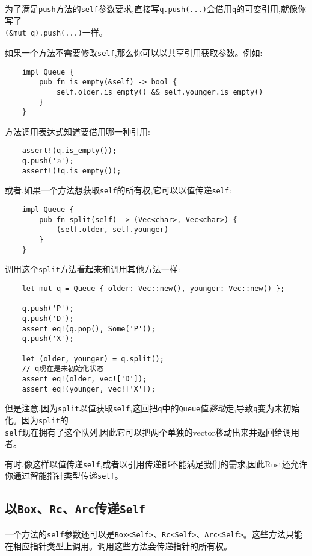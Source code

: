 为了满足\texttt{push}方法的\texttt{self}参数要求,直接写\texttt{q.push(...)}会借用\texttt{q}的可变引用,就像你写了\\
\texttt{(\&mut q).push(...)}一样。

如果一个方法不需要修改\texttt{self},那么你可以以共享引用获取参数。例如:
\begin{verbatim}
    impl Queue {
        pub fn is_empty(&self) -> bool {
            self.older.is_empty() && self.younger.is_empty()
        }
    }
\end{verbatim}

方法调用表达式知道要借用哪一种引用:
\begin{verbatim}
    assert!(q.is_empty());
    q.push('☉');
    assert!(!q.is_empty());
\end{verbatim}

或者,如果一个方法想获取\texttt{self}的所有权,它可以以值传递\texttt{self}:
\begin{verbatim}
    impl Queue {
        pub fn split(self) -> (Vec<char>, Vec<char>) {
            (self.older, self.younger)
        }
    }
\end{verbatim}

调用这个\texttt{split}方法看起来和调用其他方法一样:
\begin{verbatim}
    let mut q = Queue { older: Vec::new(), younger: Vec::new() };

    q.push('P');
    q.push('D');
    assert_eq!(q.pop(), Some('P'));
    q.push('X');

    let (older, younger) = q.split();
    // q现在是未初始化状态
    assert_eq!(older, vec!['D']);
    assert_eq!(younger, vec!['X']);
\end{verbatim}

但是注意,因为\texttt{split}以值获取\texttt{self},这回把\texttt{q}中的\texttt{Queue}值\emph{移动}走,导致\texttt{q}变为未初始化。因为\texttt{split}的\\
\texttt{self}现在拥有了这个队列,因此它可以把两个单独的vector移动出来并返回给调用者。

有时,像这样以值传递\texttt{self},或者以引用传递都不能满足我们的需求,因此Rust还允许你通过智能指针类型传递\texttt{self}。

\subsection{以\texttt{Box}、\texttt{Rc}、\texttt{Arc}传递\texttt{Self}}

一个方法的\texttt{self}参数还可以是\texttt{Box<Self>}、\texttt{Rc<Self>}、\texttt{Arc<Self>}。这些方法只能在相应指针类型上调用。调用这些方法会传递指针的所有权。

